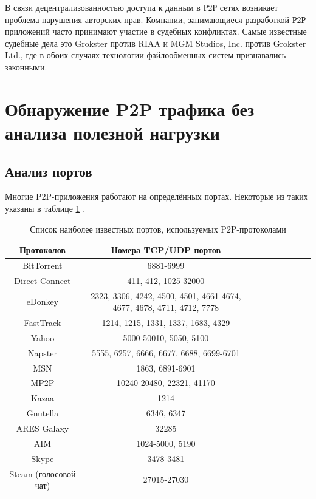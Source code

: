 \documentclass[bachelor, och, coursework]{SCWorks}
\begin{document}
В связи децентрализованностью доступа к данным в Р2Р сетях возникает проблема нарушения авторских прав. 
Компании, занимающиеся разработкой Р2Р приложений часто принимают участие в судебных конфликтах. 
Самые известные судебные дела это Grokster против RIAA и MGM Studios, Inc. против Grokster Ltd., 
где в обоих случаях технологии файлообменных систем признавались законными.

\section{Обнаружение P2P трафика без анализа полезной нагрузки}
\subsection{Анализ портов}
Многие P2P-приложения работают на определённых портах. 
Некоторые из таких указаны в таблице \ref{table:p2p-ports} \cite{p2p-list}.

\begin{table}[H]
    \caption{Список наиболее известных портов, используемых P2P-протоколами}
    \label{table:p2p-ports}
    \begin{center}
    {\small
    \begin{tabular}{|c|c|c|c|c|c|c|c|c|}
        \hline
    Протоколов   & Номера TCP/UDP портов \\ \hline
    BitTorrent      & 6881-6999  \\ \hline
    Direct Connect  & 411, 412, 1025-32000  \\ \hline
    eDonkey         & 2323, 3306, 4242, 4500, 4501, 4661-4674, 4677, 4678, 4711, 4712, 7778  \\ \hline
    FastTrack       & 1214, 1215, 1331, 1337, 1683, 4329  \\ \hline
    Yahoo           & 5000-50010, 5050, 5100  \\ \hline
    Napster         & 5555, 6257, 6666, 6677, 6688, 6699-6701  \\ \hline
    MSN             & 1863, 6891-6901 \\ \hline
    MP2P            & 10240-20480, 22321, 41170  \\ \hline
    Kazaa           & 1214  \\ \hline
    Gnutella        & 6346, 6347  \\ \hline
    ARES Galaxy     & 32285  \\ \hline
    AIM             & 1024-5000, 5190  \\ \hline
    Skype           & 3478-3481 \\ \hline
    Steam (голосовой чат) & 27015-27030 \\ \hline
    \end{tabular}
    }
    \end{center}
\end{table}
\end{document}
